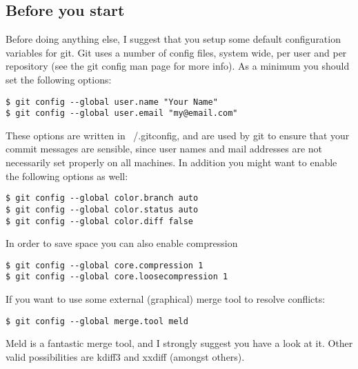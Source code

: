 \documentclass[a4paper,10pt]{article}
\begin{document}
\subsection{Before you start}
Before doing anything else, I suggest that you setup some default
configuration variables for git. Git uses a number of config files, system
wide, per user and per repository (see the git config man page for more info).
As a minimum you should set the following options:
\begin{verbatim}
$ git config --global user.name "Your Name"
$ git config --global user.email "my@email.com"
\end{verbatim}
These options are written in ~/.gitconfig, and are used by git to ensure that
your commit messages are sensible, since user names and mail addresses are not
necessarily set properly on all machines. In addition you might want to enable
the following options as well:
\begin{verbatim}
$ git config --global color.branch auto
$ git config --global color.status auto
$ git config --global color.diff false
\end{verbatim}
In order to save space you can also enable compression
\begin{verbatim}
$ git config --global core.compression 1
$ git config --global core.loosecompression 1
\end{verbatim}
If you want to use some external (graphical) merge tool to resolve conflicts:
\begin{verbatim}
$ git config --global merge.tool meld
\end{verbatim}
Meld is a fantastic merge tool, and I strongly suggest you have a look at it.
Other valid possibilities are kdiff3 and xxdiff (amongst others).
\end{document}
